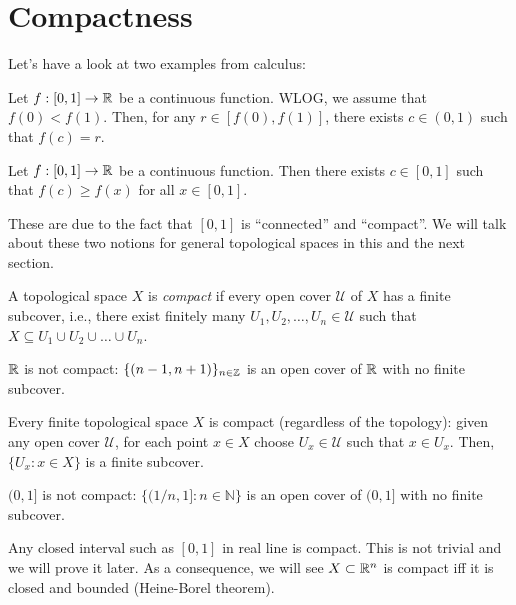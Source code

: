 \section{Compactness}

Let's have a look at two examples from calculus:


\begin{theorem}
    Let $f:[0,1]\to\mathbb{R}$ be a continuous function. WLOG, we assume that $f(0)<f(1)$. Then, for any $r\in [f(0),f(1)]$, there exists $c\in (0,1)$ such that $f(c)=r$.
\end{theorem}


\begin{theorem}
    Let $f:[0,1]\to\mathbb{R}$ be a continuous function. Then there exists $c\in[0,1]$ such that $f(c)\ge f(x)$ for all $x\in[0,1]$.
\end{theorem}




These are due to the fact that  $[0,1]$ is ``connected'' and ``compact''. We will talk about these two notions for general topological spaces in this and the next section.


\begin{definition}
    A topological space \(X\) is \emph{compact} if every open cover $\mathcal{U}$ of \(X\) has a finite subcover, i.e., there exist finitely many \(U_1, U_2, \ldots, U_n \in \mathcal{U}\) such that \(X \subseteq U_1 \cup U_2 \cup \ldots \cup U_n\).
\end{definition}



\begin{example}
    $\mathbb{R}$ is not compact: $\{(n-1,n+1)\}_{n\in\mathbb{Z}}$ is an open cover of $\mathbb{R}$ with no finite subcover.
\end{example}

\begin{example}
    Every finite topological space $X$ is compact (regardless of the topology): given any open cover $\mathcal{U}$, for each point $x\in X$ choose $U_x\in\mathcal{U}$ such that $x\in U_x$. Then, $\{U_x:x\in X\}$ is a finite subcover.
\end{example}

\begin{example}
    $(0,1]$ is not compact: $\{(1/n,1]:n\in\mathbb{N}\}$ is an open cover of $(0,1]$ with no finite subcover.
\end{example}


\begin{example}
    Any closed interval such as $[0,1]$ in real line is compact. This is not trivial and we will prove it later. As a consequence, we will see $X\subset\mathbb{R}^n$ is compact iff it is closed and bounded (Heine-Borel theorem). 
\end{example}

